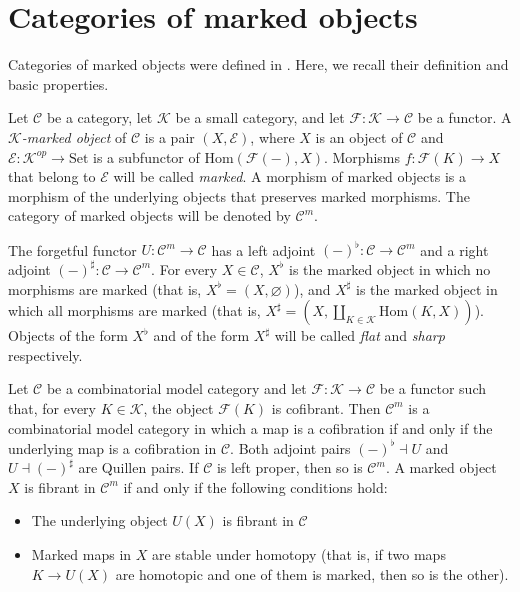\documentclass[reqno]{amsart}
\theoremstyle{definition}
\theoremstyle{remark}
\newcommand{\fs}[1]{\mathrm{#1}}
\newcommand{\Hom}{\fs{Hom}}
\newcommand{\cat}[1]{\mathcal{#1}}
\newcommand{\C}{\cat{C}}
\newcommand{\K}{\cat{K}}
\newcommand{\Set}{\fs{Set}}
\numberwithin{figure}{section}
\begin{document}
\section{Categories of marked objects}

Categories of marked objects were defined in \cite{marked-obj}.
Here, we recall their definition and basic properties.

\begin{defn}
Let $\C$ be a category, let $\mathcal{K}$ be a small category, and let $\mathcal{F} : \mathcal{K} \to \C$ be a functor.
A \emph{$\K$-marked object} of $\C$ is a pair $(X,\mathcal{E})$, where $X$ is an object of $\C$ and $\mathcal{E} : \mathcal{K}^{op} \to \Set$ is a subfunctor of $\Hom(\mathcal{F}(-),X)$.
Morphisms $f : \mathcal{F}(K) \to X$ that belong to $\mathcal{E}$ will be called \emph{marked}.
A morphism of marked objects is a morphism of the underlying objects that preserves marked morphisms.
The category of marked objects will be denoted by $\C^m$.
\end{defn}

The forgetful functor $U : \C^m \to \C$ has a left adjoint $(-)^\flat : \C \to \C^m$ and a right adjoint $(-)^\sharp : \C \to \C^m$.
For every $X \in \C$, $X^\flat$ is the marked object in which no morphisms are marked (that is, $X^\flat = (X,\varnothing)$),
and $X^\sharp$ is the marked object in which all morphisms are marked (that is, $X^\sharp = (X,\coprod_{K \in \mathcal{K}} \Hom(K,X))$).
Objects of the form $X^\flat$ and of the form $X^\sharp$ will be called \emph{flat} and \emph{sharp} respectively.

\begin{thm}
Let $\C$ be a combinatorial model category and let $\mathcal{F} : \mathcal{K} \to \C$ be a functor such that, for every $K \in \mathcal{K}$, the object $\mathcal{F}(K)$ is cofibrant.
Then $\C^m$ is a combinatorial model category in which a map is a cofibration if and only if the underlying map is a cofibration in $\C$.
Both adjoint pairs $(-)^\flat \dashv U$ and $U \dashv (-)^\sharp$ are Quillen pairs.
If $\C$ is left proper, then so is $\C^m$.
A marked object $X$ is fibrant in $\C^m$ if and only if the following conditions hold:
\begin{itemize}
\item The underlying object $U(X)$ is fibrant in $\C$
\item Marked maps in $X$ are stable under homotopy (that is, if two maps $K \to U(X)$ are homotopic and one of them is marked, then so is the other).
\end{itemize}
\end{thm}
\end{document}
